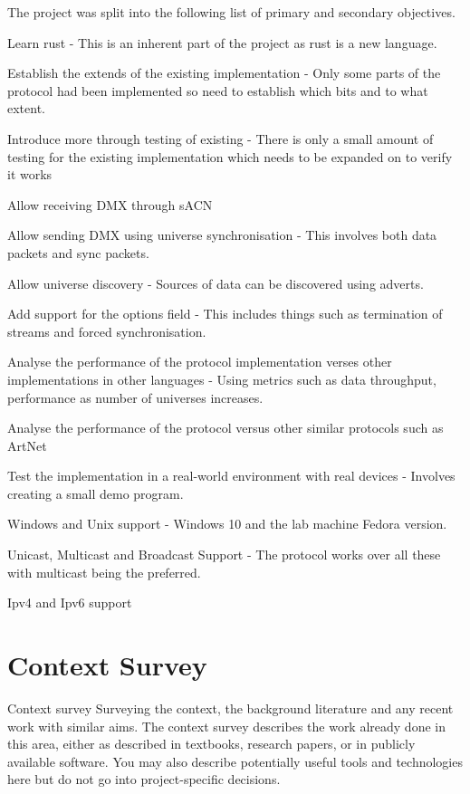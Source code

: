 \documentclass[11pt,a4paper,notitlepage]{report}
\begin{document}
	The project was split into the following list of primary and secondary objectives.\\
	\begin{list}{}{Primary}
		\item Learn rust - This is an inherent part of the project as rust is a new language.
		\item Establish the extends of the existing implementation - Only some parts of the protocol had been implemented so need to establish which bits and to what extent.
		\item Introduce more through testing of existing - There is only a small amount of testing for the existing implementation which needs to be expanded on to verify it works
		\item Allow receiving DMX through sACN
		\item Allow sending DMX using universe synchronisation - This involves both data packets and sync packets.
		\item Allow universe discovery - Sources of data can be discovered using adverts.
		\item Add support for the options field - This includes things such as termination of streams and forced synchronisation.
	\end{list}
	\begin{list}{}{Secondary}
		\item Analyse the performance of the protocol implementation verses other implementations in other languages - Using metrics such as data throughput, performance as number of universes increases.
		\item Analyse the performance of the protocol versus other similar protocols such as ArtNet \cite{ArtNet}
		\item Test the implementation in a real-world environment with real devices - Involves creating a small demo program.
		\item Windows and Unix support - Windows 10 and the lab machine Fedora version.
		\item Unicast, Multicast and Broadcast Support - The protocol works over all these with multicast being the preferred.
		\item Ipv4 and Ipv6 support
	\end{list}
	
	
	\section{Context Survey}
	Context survey
	Surveying the context, the background literature and
	any recent work with similar aims. The context survey
	describes the work already done in this area, either as
	described in textbooks, research papers, or in publicly
	available software. You may also describe potentially
	useful tools and technologies here but do not go into
	project-specific decisions.
	
\end{document}
